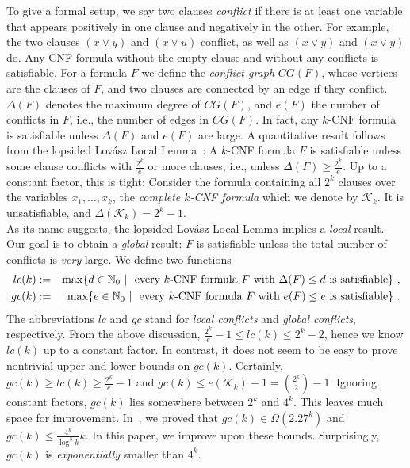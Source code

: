 \documentclass[a4paper, 11pt]{article}
\begin{document}
To give a formal setup, we say two clauses {\em conflict} if there is
at least one variable that appears positively in one clause and
negatively in the other. For example, the two clauses $(x \vee y)$ and
$(\bar{x} \vee u)$ conflict, as well as $(x \vee y)$ and $(\bar{x}
\vee \bar{y})$ do.  Any CNF formula without the empty clause and
without any conflicts is satisfiable.  For a formula $F$ we define the
{\em conflict graph} $CG(F)$, whose vertices are the clauses of $F$,
and two clauses are connected by an edge if they conflict. $\Delta(F)$
denotes the maximum degree of $CG(F)$, and $e(F)$ the number of
conflicts in $F$, i.e., the number of edges in $CG(F)$.  In fact, any
$k$-CNF formula is satisfiable unless $\Delta(F)$ and $e(F)$ are
large. A quantitative result follows from the lopsided Lov\'asz Local
Lemma~\cite{ES1991,AS2000,LS2007}: A $k$-CNF formula $F$ is
satisfiable unless some clause conflicts with $\frac{2^k}{e}$ or more
clauses, i.e., unless $\Delta(F) \geq \frac{2^k}{e}$. Up to a constant
factor, this is tight: Consider the formula containing all $2^k$
clauses over the variables $x_1, \dots, x_k$, the {\em complete
  $k$-CNF formula} which we denote by $\mathcal{K}_k$.  It is
unsatisfiable, and
$\Delta(\mathcal{K}_k)=2^k-1$.\\

As its name suggests, the lopsided Lov\'asz Local Lemma implies a {\em
local} result.
Our goal is to obtain a {\em global} result: $F$ is satisfiable unless the total number of
conflicts is {\em very} large. We define two functions
\begin{eqnarray*}
  lc(k) & := & \max \{d \in \mathbb{N}_0 \ | \ \textnormal{ every }
  k\textnormal{-CNF formula } F \textnormal{ with }
  \Delta(F) \leq d \textnormal{ is satisfiable} \} \ ,\\
  gc(k) & := & \max \{e \in \mathbb{N}_0 \ | \ \textnormal{ every }
  k\textnormal{-CNF formula } F \textnormal{ with }
  e(F) \leq e \textnormal{ is satisfiable} \} \ .
\end{eqnarray*}
The abbreviations $lc$ and $gc$ stand for {\em local conflicts} and
{\em global conflicts}, respectively. From the above discussion,
$\frac{2^k}{e}-1 \leq lc(k) \leq 2^k-2$, hence we know $lc(k)$ up to a
constant factor. In contrast, it does not seem to be easy to prove
nontrivial upper and lower bounds on $gc(k)$.  Certainly, $gc(k) \geq
lc(k) \geq \frac{2^k}{e}-1$ and $gc(k) \leq e(\mathcal{K}_k)-1 =
\binom{2^k}{2}-1$.  Ignoring constant factors, $gc(k)$ lies somewhere
between $2^k$ and $4^k$.  This leaves much space for improvement.
In~\cite{SZ2008}, we proved that $gc(k) \in \Omega(2.27^k)$ and $gc(k)
\leq \frac{4^k}{\log^3 k}{k}$. In this paper, we improve upon these
bounds.  Surprisingly, $gc(k)$ is \emph{exponentially} smaller than
$4^k$.
\end{document}
